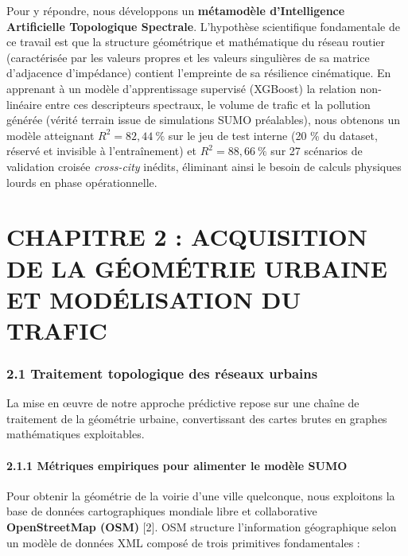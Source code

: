 \documentclass[10pt, a4paper]{article}
\begin{document}
Pour y répondre, nous développons un \textbf{métamodèle d'Intelligence
Artificielle Topologique Spectrale}. L'hypothèse scientifique
fondamentale de ce travail est que la structure géométrique et
mathématique du réseau routier (caractérisée par les valeurs propres et
les valeurs singulières de sa matrice d'adjacence d'impédance) contient
l'empreinte de sa résilience cinématique. En apprenant à un modèle
d'apprentissage supervisé (XGBoost) la relation non-linéaire entre ces
descripteurs spectraux, le volume de trafic et la pollution générée
(vérité terrain issue de simulations SUMO préalables), nous obtenons un
modèle atteignant \(R^2 = 82{,}44\ \%\) sur le jeu de test interne (20
\% du dataset, réservé et invisible à l'entraînement) et
\(R^2 = 88{,}66\ \%\) sur 27 scénarios de validation croisée
\emph{cross-city} inédits, éliminant ainsi le besoin de calculs
physiques lourds en phase opérationnelle.

\newpage

\section{CHAPITRE 2 : ACQUISITION DE LA GÉOMÉTRIE URBAINE ET
MODÉLISATION DU
TRAFIC}\label{chapitre-2-acquisition-de-la-guxe9omuxe9trie-urbaine-et-moduxe9lisation-du-trafic}

\subsubsection{2.1 Traitement topologique des réseaux
urbains}\label{traitement-topologique-des-ruxe9seaux-urbains}

La mise en œuvre de notre approche prédictive repose sur une chaîne de
traitement de la géométrie urbaine, convertissant des cartes brutes en
graphes mathématiques exploitables.

\paragraph{2.1.1 Métriques empiriques pour alimenter le modèle
SUMO}\label{muxe9triques-empiriques-pour-alimenter-le-moduxe8le-sumo}

Pour obtenir la géométrie de la voirie d'une ville quelconque, nous
exploitons la base de données cartographiques mondiale libre et
collaborative \textbf{OpenStreetMap (OSM)} {[}2{]}. OSM structure
l'information géographique selon un modèle de données XML composé de
trois primitives fondamentales :
\end{document}
